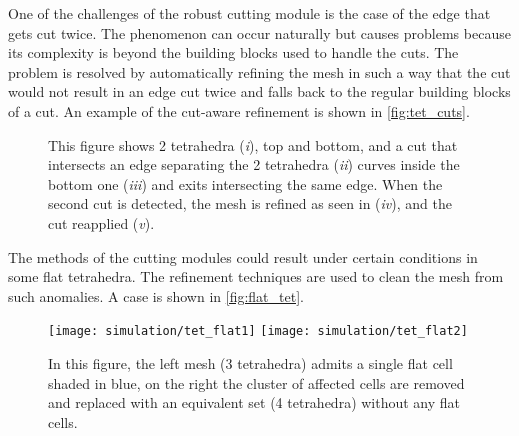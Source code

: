 One of the challenges of the robust cutting module is the case of the edge that gets cut twice. The phenomenon can occur naturally but causes problems because its complexity is beyond the building blocks used to handle the cuts. The problem is resolved by automatically refining the mesh in such a way that the cut would not result in an edge cut twice and falls back to the regular building blocks of a cut. An example of the cut-aware refinement is shown in \autoref{fig:tet_cuts}.

\begin{figure}
  \centering%
  \hfill%
  \hfill%
  \hfill%
  \hfill%
  \caption{This figure shows 2 tetrahedra (\emph{i}), top and bottom, and a cut that intersects an edge separating the 2 tetrahedra (\emph{ii}) curves inside the bottom one (\emph{iii}) and exits intersecting the same edge. When the second cut is detected, the mesh is refined as seen in (\emph{iv}), and the cut reapplied (\emph{v}).}\label{fig:tet_cuts}
\end{figure}

The methods of the cutting modules could result under certain conditions in some flat tetrahedra. The refinement techniques are used to clean the mesh from such anomalies. A case is shown in \autoref{fig:flat_tet}.

\begin{figure}
  \centering%
  \texttt{[image: simulation/tet\_flat1]}\label{fig:tet_flat1}
  \hspace{10ex}
  \texttt{[image: simulation/tet\_flat2]}\label{fig:tet_flat2}
  \caption{In this figure, the left mesh (3 tetrahedra) admits a single flat cell shaded in blue, on the right the cluster of affected cells are removed and replaced with an equivalent set (4 tetrahedra) without any flat cells.}\label{fig:flat_tet}
\end{figure}


